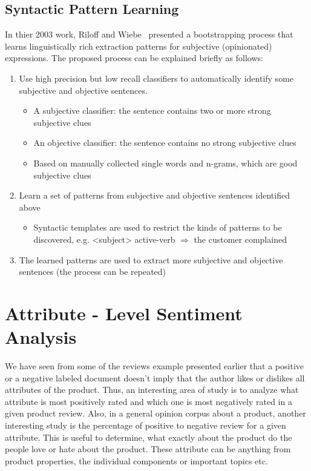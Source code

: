 \subsection{Syntactic Pattern Learning}
In thier 2003 work, Riloff and Wiebe~\parencite{ch2:reiloff} presented a bootstrapping process that learns linguistically rich extraction patterns for subjective (opinionated) expressions. The proposed process can be explained briefly as follows: 
\begin{enumerate}
\item Use high precision but low recall classifiers to automatically identify some subjective and objective sentences.
\begin{itemize}
\item A subjective classifier: the sentence contains two or more strong subjective clues
\item An objective classifier: the sentence contains no strong subjective clues
\item Based on manually collected single words and n-grams, which are good subjective clues
\end{itemize}
\item Learn a set of patterns from subjective and objective sentences identified above
\begin{itemize}
\item Syntactic templates are used to restrict the kinds of patterns to be discovered, e.g. <subject> active-verb $\Rightarrow$ the customer complained
\end{itemize}
\item The learned patterns are used to extract more subjective and objective sentences (the process can be repeated)
\end{enumerate}  

\section{Attribute - Level Sentiment Analysis}
We have seen from some of the reviews example presented earlier that a positive or a negative labeled document doesn't imply that the author likes or dislikes all attributes of the product. Thus, an interesting area of study is to analyze what attribute is most positively rated and which one is most negatively rated in a given product review. Also, in a general opinion corpus about a product, another interesting study is the percentage of positive to negative review for a given attribute. This is useful to determine, what exactly about the product do the people love or hate about the product. These attribute can be anything from product properties, the individual components or important topics etc. 

